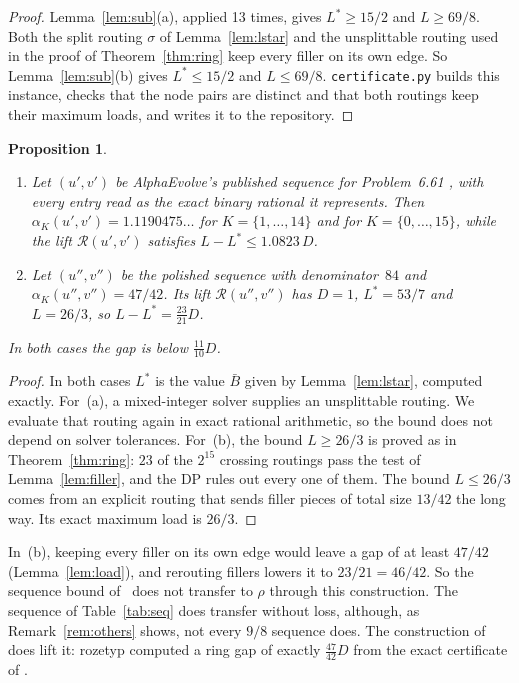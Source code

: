 \documentclass[11pt]{article}
\theoremstyle{plain}
\newtheorem{proposition}[theorem]{Proposition}
\theoremstyle{definition}
\theoremstyle{remark}
\begin{document}
\begin{proof}
Lemma~\ref{lem:sub}(a), applied 13 times, gives $L^*\ge15/2$ and $L\ge69/8$.
Both the split routing $\sigma$ of Lemma~\ref{lem:lstar} and the unsplittable routing used in the proof of Theorem~\ref{thm:ring} keep every filler on its own edge. So Lemma~\ref{lem:sub}(b) gives $L^*\le15/2$ and $L\le69/8$.
\texttt{certificate.py} builds this instance, checks that the node pairs are distinct and that both routings keep their maximum loads, and writes it to the repository.
\end{proof}

\begin{proposition}\label{prop:ae}
\begin{enumerate}[label=(\alph*),leftmargin=*]
\item Let $(u',v')$ be AlphaEvolve's published sequence for Problem~6.61 \cite{AERepo}, with every entry read as the exact binary rational it represents. Then $\alpha_K(u',v')=1.1190475\ldots$ for $K=\{1,\dots,14\}$ and for $K=\{0,\dots,15\}$, while the lift $\mathcal{R}(u',v')$ satisfies $L-L^*\le 1.0823\,D$.
\item Let $(u'',v'')$ be the polished sequence with denominator~$84$ and $\alpha_K(u'',v'')=47/42$. Its lift $\mathcal{R}(u'',v'')$ has $D=1$, $L^*=53/7$ and $L=26/3$, so $L-L^*=\tfrac{23}{21}D$.
\end{enumerate}
In both cases the gap is below $\tfrac{11}{10}D$.
\end{proposition}

\begin{proof}
In both cases $L^*$ is the value $\bar B$ given by Lemma~\ref{lem:lstar}, computed exactly.
For~(a), a mixed-integer solver supplies an unsplittable routing. We evaluate that routing again in exact rational arithmetic, so the bound does not depend on solver tolerances.
For~(b), the bound $L\ge 26/3$ is proved as in Theorem~\ref{thm:ring}: $23$ of the $2^{15}$ crossing routings pass the test of Lemma~\ref{lem:filler}, and the DP rules out every one of them.
The bound $L\le26/3$ comes from an explicit routing that sends filler pieces of total size $13/42$ the long way. Its exact maximum load is $26/3$.
\end{proof}

In~(b), keeping every filler on its own edge would leave a gap of at least $47/42$ (Lemma~\ref{lem:load}), and rerouting fillers lowers it to $23/21=46/42$.
So the sequence bound of~\cite{GGTW25} does not transfer to $\rho$ through this construction.
The sequence of Table~\ref{tab:seq} does transfer without loss, although, as Remark~\ref{rem:others} shows, not every $9/8$ sequence does.
The construction of \cite[Lemma~7]{Dau22} does lift it: rozetyp computed a ring gap of exactly $\tfrac{47}{42}D$ from the exact certificate of \cite{Yad26} \cite{Roz26}.
\end{document}
